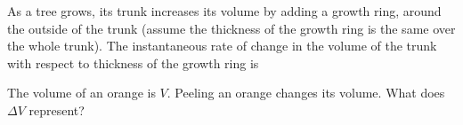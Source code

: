 \documentclass{ximera}
\newcommand{\recommendation}[1]{}
\newcommand{\GoodQuestions}[1]{}
\begin{document}


\begin{problem}
  \recommendation{Vic}
  \GoodQuestions{Subject: Maximum and minimum values 6D}
  
  As a tree grows, its trunk increases its volume by adding a growth
  ring, around the outside of the trunk (assume the thickness of the
  growth ring is the same over the whole trunk).  The instantaneous
  rate of change in the volume of the trunk with respect to thickness
  of the growth ring is
  \begin{multipleChoice}
  \end{multipleChoice}
\end{problem}


\begin{problem}
  \recommendation{Vic}
  \recommendation{Elizabeth}
  \GoodQuestions{Subject: Linear approximation 7Q}
  The volume of an orange is $V$.  Peeling an orange changes its volume.  What does $\Delta V$
  represent?  
  \begin{multipleChoice}
  \end{multipleChoice}
\end{problem}



\end{document}
